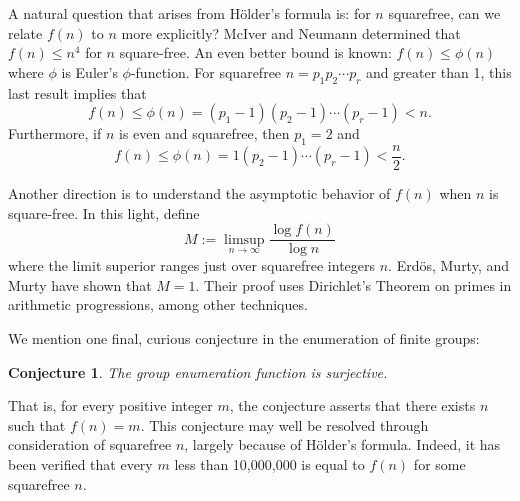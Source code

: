 \documentclass[12pt,reqno]{amsart}
\theoremstyle{plain}
\newtheorem{conj}[thm]{Conjecture}
\theoremstyle{definition}
\numberwithin{equation}{section}
\begin{document}
A natural question that arises from H\"older's formula is: for $n$ squarefree, can we relate $f(n)$ to $n$ more explicitly? McIver and Neumann determined that $f(n)\le n^4$ for $n$ square-free. An even better bound is known: $f(n)\le\phi(n)$ where $\phi$ is Euler's $\phi$-function. For squarefree $n=p_1 p_2 \cdots p_r$ and greater than 1, this last result implies that
\[ f(n)\le\phi(n)=(p_1-1)(p_2-1)\cdots(p_r-1)<n. \]
Furthermore, if $n$ is even and squarefree, then $p_1=2$ and
\[ f(n)\le\phi(n)=1(p_2-1)\cdots(p_r-1)<\frac{n}{2}. \]

Another direction is to understand the asymptotic behavior of $f(n)$ when $n$ is square-free. In this light, define
\[ M:=\limsup_{n\rightarrow\infty}\frac{\log f(n)}{\log n} \]
where the limit superior ranges just over squarefree integers $n$. Erd\"os, Murty, and Murty have shown that $M=1$. Their proof uses Dirichlet's Theorem on primes in arithmetic progressions, among other techniques.

We mention one final, curious conjecture in the enumeration of finite groups:

\begin{conj}
    The group enumeration function is surjective. 
\end{conj}

\medskip 
That is, for every positive integer $m$, the conjecture asserts that there exists $n$ such that $f(n)=m$. 
This conjecture may well be resolved through consideration of squarefree $n$, largely because of H\"older's formula. Indeed, it has been verified that every $m$ less than 10,000,000 is equal to $f(n)$ for some squarefree $n$.



\end{document}
